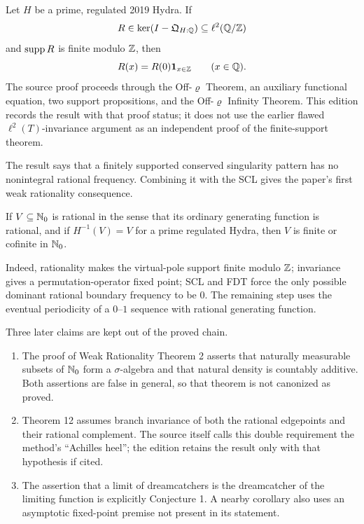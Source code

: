\begin{status}
\label{status:FDT}
Let $H$ be a prime, regulated 2019 Hydra.  If
\[
 R\in\ker(I-\mathfrak Q_{H:\mathbb Q})\subseteq\ell^2(\mathbb Q/\mathbb Z)
\]
and $\operatorname{supp} R$ is finite modulo $\mathbb Z$, then
\begin{equation}
\label{eq:FDT}
 R(x)=R(0)\mathbf 1_{x\in\mathbb Z}
 \qquad(x\in\mathbb Q).
\end{equation}
The source proof proceeds through the Off-$\varrho$ Theorem, an auxiliary
functional equation, two support propositions, and the Off-$\varrho$
Infinity Theorem.  This edition records the result with that proof status;
it does not use the earlier flawed $\ell^2(T)$-invariance argument as an
independent proof of the finite-support theorem.
\end{status}

The result says that a finitely supported conserved singularity pattern has
no nonintegral rational frequency.  Combining it with the SCL gives the
paper's first weak rationality consequence.

\begin{status}
If $V\subseteq\mathbb N_0$ is rational in the sense that its ordinary generating
function is rational, and if $H^{-1}(V)=V$ for a prime regulated Hydra, then
$V$ is finite or cofinite in $\mathbb N_0$.
\end{status}

Indeed, rationality makes the virtual-pole support finite modulo $\mathbb Z$;
invariance gives a permutation-operator fixed point; SCL and FDT force the
only possible dominant rational boundary frequency to be $0$.  The remaining
step uses the eventual periodicity of a $0$--$1$ sequence with rational
generating function.

\begin{sourceissue}
Three later claims are kept out of the proved chain.
\begin{enumerate}[label=\textup{(\roman*)}]
\item The proof of Weak Rationality Theorem 2 asserts that naturally
      measurable subsets of $\mathbb N_0$ form a $\sigma$-algebra and that natural
      density is countably additive.  Both assertions are false in general,
      so that theorem is not canonized as proved.
\item Theorem 12 assumes branch invariance of both the rational edgepoints
      and their rational complement.  The source itself calls this double
      requirement the method's ``Achilles heel''; the edition retains the
      result only with that hypothesis if cited.
\item The assertion that a limit of dreamcatchers is the dreamcatcher of the
      limiting function is explicitly Conjecture 1.  A nearby corollary also
      uses an asymptotic fixed-point premise not present in its statement.
\end{enumerate}
\end{sourceissue}
